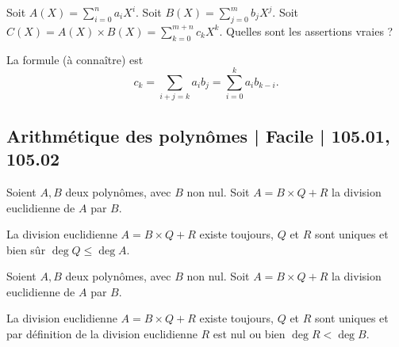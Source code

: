 \begin{question}
Soit $A(X) = \sum_{i=0}^n a_i X^i$.
Soit $B(X) = \sum_{j=0}^m b_j X^j$.
Soit $C(X) = A(X) \times B(X) = \sum_{k=0}^{m+n} c_k X^k$.
Quelles sont les assertions vraies ?
\begin{answers}


    
\end{answers}
\begin{explanations}
La formule (à connaître) est 
$$c_k = \sum_{i+j=k} a_ib_j = \sum_{i=0}^k a_ib_{k-i}.$$
\end{explanations}
\end{question}


\subsection{Arithmétique des polynômes | Facile | 105.01, 105.02}


\begin{question}
Soient $A,B$ deux polynômes, avec $B$ non nul. 
Soit $A = B \times Q + R$ la division euclidienne de $A$ par $B$. 
\begin{answers}



\end{answers}
\begin{explanations}
La division euclidienne $A = B \times Q + R$ existe toujours, $Q$ et $R$ sont uniques et bien sûr $\deg Q \le \deg A$.
\end{explanations}
\end{question}


\begin{question}
Soient $A,B$ deux polynômes, avec $B$ non nul. 
Soit $A = B \times Q + R$ la division euclidienne de $A$ par $B$.

\begin{answers}



\end{answers}
\begin{explanations}
La division euclidienne $A = B \times Q + R$ existe toujours, $Q$ et $R$ sont uniques et par définition de la division euclidienne $R$ est nul ou bien 
$\deg R < \deg B$.
\end{explanations}
\end{question}


